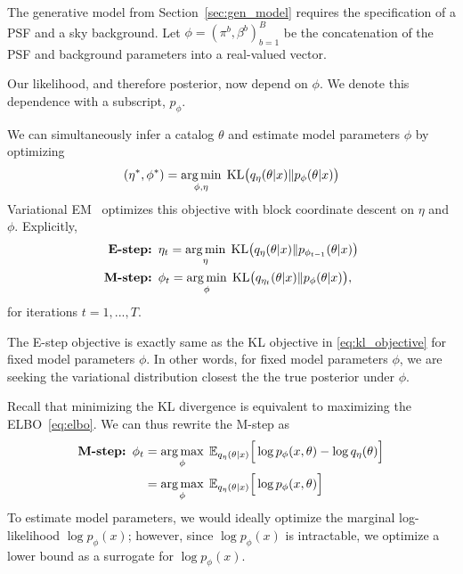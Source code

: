 The generative model from Section~\ref{sec:gen_model} requires
the specification of a PSF and a sky background. Let $\phi = (\pi^b, \beta^b)_{b = 1}^B$ be the concatenation of the PSF and background parameters into a real-valued vector. 

Our likelihood, and therefore posterior, now depend on $\phi$. We denote this dependence with a subscript, $p_\phi$. 

We can simultaneously infer a catalog $\theta$ and 
estimate model parameters $\phi$ by optimizing 
\begin{align}
(\eta^*, \phi^*) = \operatorname*{arg\,min}_{\phi, \eta} \; \mathrm{KL}\big (q_{\eta}(\theta |x) \| p_{\phi}(\theta | x)\big)\label{eq:em_obj}
\end{align}
Variational EM~\cite{Jordan_intro_vi, neal2000varem, Beal2002varem} optimizes this objective with block coordinate descent on $\eta$ and $\phi$. Explicitly, 
\begin{align}
    \text{{\bf E-step: }} & 
    \eta_{t} = \operatorname*{arg\,min}_\eta \; \mathrm{KL}\big (q_{\eta    }(\theta |x) \| p_{\phi_{t - 1}}(\theta | x)\big)
    \label{eq:e_step}
    \\
    \text{{\bf M-step: }} & \phi_{t} = \operatorname*{arg\,min}_{\phi} \; \mathrm{KL}\big (q_{\eta_t}(\theta |x) \| p_{\phi}(\theta | x)\big), 
    \label{eq:m_step}
\end{align}
for iterations $t = 1, ..., T$. 

The E-step objective is exactly same as the KL objective in \eqref{eq:kl_objective} for fixed model parameters $\phi$. 
In other words, for fixed model parameters $\phi$, we are seeking the variational distribution closest the the true posterior under $\phi$. 

Recall that minimizing the KL divergence is equivalent to maximizing the ELBO~\eqref{eq:elbo}. We can thus rewrite the M-step as 
\begin{align}
    \text{{\bf M-step: }} \phi_{t} &= \operatorname*{arg\,max}_{\phi} \; \mathbb{E}_{q_{\eta}(\theta | x)}\Big[\log p_\phi(x, \theta) - \log q_\eta(\theta)\Big] \\
    &= \operatorname*{arg\,max}_{\phi} \; \mathbb{E}_{q_{\eta}(\theta | x)}\Big[\log p_\phi(x, \theta)\Big]    \label{eq:m_step}
\end{align} 
To estimate model parameters, we would ideally optimize the marginal log-likelihood $\log p_\phi(x)$; however, since $\log p_\phi(x)$ is intractable, we optimize a lower bound as a surrogate for $\log p_\phi(x)$. 

